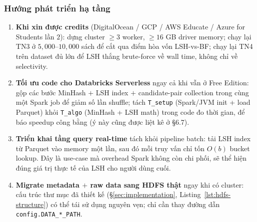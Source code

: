 \subsubsection{Hướng phát triển hạ tầng}

\begin{enumerate}
    \item \textbf{Khi xin được credits} (DigitalOcean / GCP / AWS Educate / Azure for Students lần $2$): dựng cluster $\geq 3$ worker, $\geq 16$ GB driver memory; chạy lại TN3 ở $5{,}000$--$10{,}000$ sách để cắt qua điểm hòa vốn LSH-vs-BF; chạy lại TN4 trên dataset đủ lớn để LSH thắng brute-force về wall time, không chỉ về selectivity.
    \item \textbf{Tối ưu code cho Databricks Serverless} ngay cả khi vẫn ở Free Edition: gộp các bước MinHash $+$ LSH index $+$ candidate-pair collection trong cùng một Spark job để giảm số lần shuffle; tách \texttt{T\_setup} (Spark/JVM init + load Parquet) khỏi \texttt{T\_algo} (MinHash + LSH math) trong code đo thời gian, để báo speedup công bằng (ý này cũng được liệt kê ở \S6.7).
    \item \textbf{Triển khai tầng query real-time} tách khỏi pipeline batch: tải LSH index từ Parquet vào memory một lần, sau đó mỗi truy vấn chỉ tốn $O(b)$ bucket lookup. Đây là use-case mà overhead Spark không còn chi phối, sẽ thể hiện đúng giá trị thực tế của LSH cho người dùng cuối.
    \item \textbf{Migrate metadata $+$ raw data sang HDFS thật} ngay khi có cluster: cấu trúc thư mục đã thiết kế (\S\ref{sec:implementation}, Listing~\ref{lst:hdfs-structure}) có thể tái sử dụng nguyên vẹn; chỉ cần thay đường dẫn \texttt{config.DATA\_*\_PATH}.
\end{enumerate}